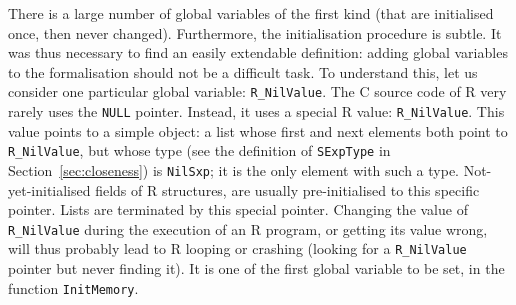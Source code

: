 \documentclass{article}
\newcommand\R{R}
\newcommand\Cn{C}
\begin{document}
There is a large number of global variables of the first kind
(that are initialised once, then never changed).
Furthermore, the initialisation procedure is subtle.
It was thus necessary to find an easily extendable definition:
adding global variables to the formalisation should not be a difficult task.
To understand this, let us consider one particular
global variable: \texttt{R_NilValue}.
The \Cn{} source code of \R{} very rarely uses
the \texttt{NULL} pointer.
Instead, it uses a special \R{} value: \texttt{R_NilValue}.
This value points to a simple object:
a list whose first and next elements both point
to \texttt{R_NilValue},
but whose type
(see the definition of \texttt{SExpType} in Section~\ref{sec:closeness})
is \texttt{NilSxp};
it is the only element with such a type.
%
Not-yet-initialised fields of \R{} structures,
are usually pre-initialised to this specific pointer.
Lists are terminated by this special pointer.
Changing the value of \texttt{R_NilValue}
during the execution of an \R{} program,
or getting its value wrong,
will thus probably lead to \R{} looping or crashing
(looking for a \texttt{R_NilValue} pointer but never finding it).
It is one of the first global variable to be set,
in the function \texttt{InitMemory}.
\end{document}
